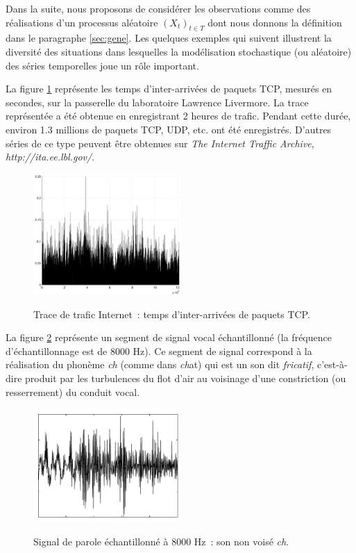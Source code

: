 Dans la suite, nous proposons de consid\'erer les observations comme
des r\'ealisations d'un processus al\'eatoire $(X_t)_{t\in T}$ dont nous
donnons la d\'efinition dans le paragraphe \ref{sec:gene}. Les quelques
exemples qui suivent illustrent la diversit\'e des situations dans
lesquelles la mod\'elisation stochastique (ou al\'eatoire) des s\'eries
temporelles joue un r\^ole important.
\begin{example}
La figure \ref{fig:figtraf} repr\'esente les temps d'inter-arriv\'ees
de paquets TCP, mesur\'es en secondes, sur la passerelle du
laboratoire Lawrence Livermore. La trace repr\'esent\'ee a \'et\'e obtenue
en enregistrant 2 heures de trafic. Pendant cette dur\'ee, environ
1.3 millions de paquets TCP, UDP, etc. ont \'et\'e enregistr\'es.
D'autres s\'eries de ce type peuvent \^{e}tre obtenues sur
\emph{The Internet Traffic Archive},
\emph{http://ita.ee.lbl.gov/}.
\begin{figure}
  \centering
  \includegraphics[width=0.5\textwidth]{Figures/lbl_tcp_3}\\
  \caption{Trace de trafic Internet~: temps d'inter-arriv\'ees de paquets TCP.}\label{fig:figtraf}
\end{figure}
\end{example}
\begin{example}[Parole]
La figure \ref{fig:figspeech} repr\'esente un segment de signal
vocal \'echantillonn\'e (la fr\'equence d'\'echantillonnage est de 8000
Hz). Ce segment de signal correspond \`a la r\'ealisation du
phon\`eme \emph{ch} (comme dans \emph{ch}at) qui est un son
dit \emph{fricatif}, c'est-\`a-dire produit par les turbulences du
flot d'air au voisinage d'une constriction (ou resserrement) du
conduit vocal.
\begin{figure}
  \centering
  \includegraphics[width=0.5\textwidth]{Figures/phrase}\\
  \caption{Signal de parole \'echantillonn\'e \`a $8000$ Hz~:
 son non vois\'e \emph{ch}.}\label{fig:figspeech}
\end{figure}
\end{example}

